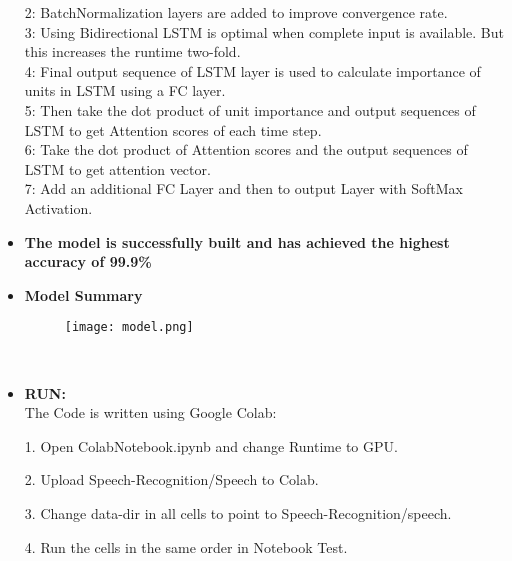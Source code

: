 \documentclass{article}
\begin{document}
\begin{itemize}
2: BatchNormalization layers are added to improve convergence rate.\\

3: Using Bidirectional LSTM is optimal when complete input is available.
But this increases the runtime two-fold.\\

4: Final output sequence of LSTM layer is used to calculate importance
of units in LSTM using a FC layer.\\

5: Then take the dot product of unit importance and output sequences of
LSTM to get Attention scores of each time step.\\

6: Take the dot product of Attention scores and the output sequences of
LSTM to get attention vector.\\

7: Add an additional FC Layer and then to output Layer with SoftMax
Activation.\\

\item{\textbf{The model is successfully built and has achieved the highest accuracy of 99.9\%}}\\

\newpage

\item{\textbf{Model Summary}}\\

\begin{figure}[h]
\texttt{[image: model.png]}
\end{figure}

\\

\item{\textbf{RUN:}}\\

The Code is written using Google Colab:\\

\item[1.]{Open ColabNotebook.ipynb and change Runtime to GPU.}

\item[2.]{Upload Speech-Recognition/Speech to Colab.}


\item[3.]{Change data-dir in all cells to point to Speech-Recognition/speech.}

\item[4.]{Run the cells in the same order in Notebook Test.}
\\


\end{itemize}
\end{document}

